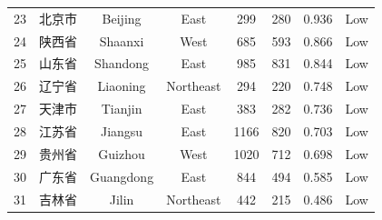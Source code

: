 \begin{table}[htbp]
{\begin{tabular}{lccccccc}
23 & 北京市 & Beijing & East & 299 & 280 & 0.936 & Low \\
24 & 陕西省 & Shaanxi & West & 685 & 593 & 0.866 & Low \\
25 & 山东省 & Shandong & East & 985 & 831 & 0.844 & Low \\
26 & 辽宁省 & Liaoning & Northeast & 294 & 220 & 0.748 & Low \\
27 & 天津市 & Tianjin & East & 383 & 282 & 0.736 & Low \\
28 & 江苏省 & Jiangsu & East & 1166 & 820 & 0.703 & Low \\
29 & 贵州省 & Guizhou & West & 1020 & 712 & 0.698 & Low \\
30 & 广东省 & Guangdong & East & 844 & 494 & 0.585 & Low \\
31 & 吉林省 & Jilin & Northeast & 442 & 215 & 0.486 & Low \\
\hline\hline
\end{tabular}
}
\end{table}